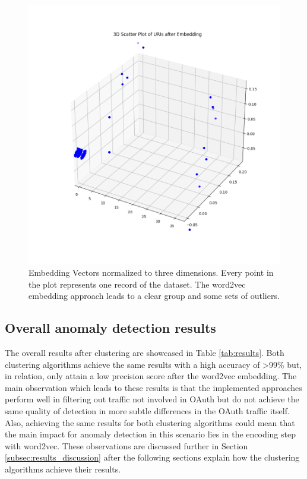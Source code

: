 \documentclass[
    fontsize=12pt,
    headings=small,
    parskip=half,           %
    bibliography=totoc,
    numbers=noenddot,       %
    open=any,               %
    ]{scrreprt}
\begin{document}
\begin{figure}[H]
	\sffamily\footnotesize
	\includegraphics[width=1\textwidth]{pic/word_embeddings_3d.png}
	\unitlength=0.75mm
	\linethickness{0.4pt}
	\caption{Embedding Vectors normalized to three dimensions. Every point in the plot represents one record of the dataset. The word2vec embedding approach leads to a clear group and some sets of outliers.}
	\label{fig:word_embeddings3D}
\end{figure}

\subsection{Overall anomaly detection results}
The overall results after clustering are showcased in Table \ref{tab:results}. Both clustering algorithms achieve the same results with a high accuracy of >99\% but, in relation, only attain a low precision score after the word2vec embedding. The main observation which leads to these results is that the implemented approaches perform well in filtering out traffic not involved in OAuth but do not achieve the same quality of detection in more subtle differences in the OAuth traffic itself. Also, achieving the same results for both clustering algorithms could mean that the main impact for anomaly detection in this scenario lies in the encoding step with word2vec. These observations are discussed further in Section \ref{subsec:results_discussion} after the following sections explain how the clustering algorithms achieve their results.
\end{document}
